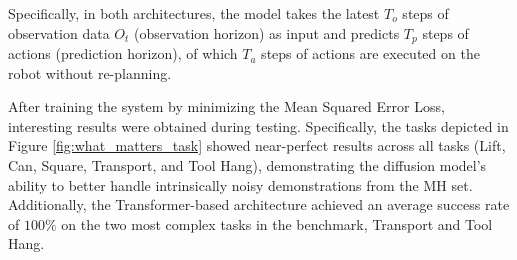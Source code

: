 

Specifically, in both architectures, the model takes the latest $T_o$ steps of observation data $O_t$ (observation horizon) as input and predicts $T_p$ steps of actions (prediction horizon), of which $T_a$ steps of actions are executed on the robot without re-planning.

After training the system by minimizing the Mean Squared Error Loss, interesting results were obtained during testing. Specifically, the tasks depicted in Figure \ref{fig:what_matters_task} showed near-perfect results across all tasks (Lift, Can, Square, Transport, and Tool Hang), demonstrating the diffusion model's ability to better handle intrinsically noisy demonstrations from the MH set. Additionally, the Transformer-based architecture achieved an average success rate of $100\%$ on the two most complex tasks in the benchmark, Transport and Tool Hang.

